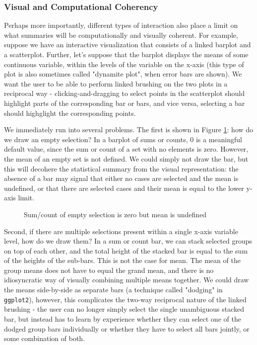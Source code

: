 \documentclass[12pt,a4paper]{article}
\begin{document}
\subsubsection{Visual and Computational Coherency}

Perhaps more importantly, different types of interaction also place a limit on what summaries will be computationally and visually coherent. For example, suppose we have an interactive visualization that consists of a linked barplot and a scatterplot. Further, let's suppose that the barplot displays the means of some continuous variable, within the levels of the variable on the x-axis (this type of plot is also sometimes called "dynamite plot", when error bars are shown). We want the user to be able to perform linked brushing on the two plots in a reciprocal way - clicking-and-dragging to select points in the scatterplot should highlight parts of the corresponding bar or bars, and vice versa, selecting a bar should highglight the corresponding points.

We immediately run into several problems. The first is shown in Figure \ref{fig:empty}: how do we draw an empty selection? In a barplot of sums or counts, 0 is a meaningful default value, since the sum or count of a set with no elements is zero. However, the mean of an empty set is not defined. We could simply not draw the bar, but this will decohere the statistical summary from the visual representation: the absence of a bar may signal that either no cases are selected and the mean is undefined, or that there are selected cases and their mean is equal to the lower y-axis limit.

\begin{figure}[H]
\centering
\caption{Sum/count of empty selection is zero but mean is undefined}
\label{fig:empty}
\end{figure}

Second, if there are multiple selections present within a single x-axis variable level, how do we draw them? In a sum or count bar, we can stack selected groups on top of each other, and the total height of the stacked bar is equal to the sum of the heights of the sub-bars. This is not the case for mean. The mean of the group means does not have to equal the grand mean, and there is no idiosyncratic way of visually combining multiple means together. We could draw the means side-by-side as separate bars (a technique called "dodging" in \texttt{ggplot2}), however, this complicates the two-way reciprocal nature of the linked brushing - the user can no longer simply select the single unambiguous stacked bar, but instead has to learn by experience whether they can select one of the dodged group bars individually or whether they have to select all bars jointly, or some combination of both.
\end{document}
